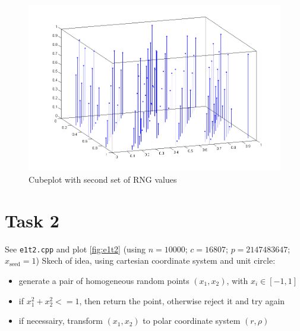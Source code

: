 \begin{figure}[b]
  \centering
  \includegraphics[width=\textwidth]{../pic/e1t1p3b.png}
  \caption{Cubeplot with second set of RNG values}
  \label{fig:e1t1p3b}
\end{figure}


\section{Task 2}
See \verb|e1t2.cpp| and plot \ref{fig:e1t2} (using $n = 10000$; $c = 16807$; $p = 2147483647$; $x_\mathrm{seed} = 1$)
Skech of idea, using cartesian coordinate system and unit circle:
\begin{itemize}
  \item generate a pair of homogeneous random points $(x_1,x_2)$, with $x_i \in [-1,1]$
  \item if $x_1^2 + x_2^2<=1$, then return the point, otherwise reject it and try again
  \item if necessairy, transform $(x_1,x_2)$ to polar coordinate system $(r,\rho)$
\end{itemize}

